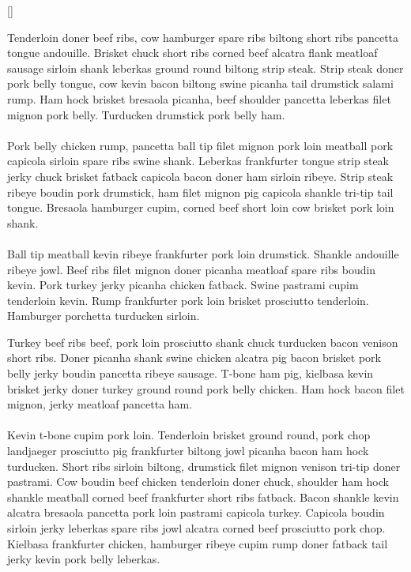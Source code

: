 []

Tenderloin doner beef ribs, cow hamburger spare ribs biltong short ribs pancetta tongue andouille. Brisket chuck short ribs corned beef alcatra flank meatloaf sausage sirloin shank leberkas ground round biltong strip steak. Strip steak doner pork belly tongue, cow kevin bacon biltong swine picanha tail drumstick salami rump. Ham hock brisket bresaola picanha, beef shoulder pancetta leberkas filet mignon pork belly. Turducken drumstick pork belly ham.

\paragraph{}
Pork belly chicken rump, pancetta ball tip filet mignon pork loin meatball pork capicola sirloin spare ribs swine shank. Leberkas frankfurter tongue strip steak jerky chuck brisket fatback capicola bacon doner ham sirloin ribeye. Strip steak ribeye boudin pork drumstick, ham filet mignon pig capicola shankle tri-tip tail tongue. Bresaola hamburger cupim, corned beef short loin cow brisket pork loin shank.

\paragraph{}
Ball tip meatball kevin ribeye frankfurter pork loin drumstick. Shankle andouille ribeye jowl. Beef ribs filet mignon doner picanha meatloaf spare ribs boudin kevin. Pork turkey jerky picanha chicken fatback. Swine pastrami cupim tenderloin kevin. Rump frankfurter pork loin brisket prosciutto tenderloin. Hamburger porchetta turducken sirloin.

Turkey beef ribs beef, pork loin prosciutto shank chuck turducken bacon venison short ribs. Doner picanha shank swine chicken alcatra pig bacon brisket pork belly jerky boudin pancetta ribeye sausage. T-bone ham pig, kielbasa kevin brisket jerky doner turkey ground round pork belly chicken. Ham hock bacon filet mignon, jerky meatloaf pancetta ham.

\paragraph{}
Kevin t-bone cupim pork loin. Tenderloin brisket ground round, pork chop landjaeger prosciutto pig frankfurter biltong jowl picanha bacon ham hock turducken. Short ribs sirloin biltong, drumstick filet mignon venison tri-tip doner pastrami. Cow boudin beef chicken tenderloin doner chuck, shoulder ham hock shankle meatball corned beef frankfurter short ribs fatback. Bacon shankle kevin alcatra bresaola pancetta pork loin pastrami capicola turkey. Capicola boudin sirloin jerky leberkas spare ribs jowl alcatra corned beef prosciutto pork chop. Kielbasa frankfurter chicken, hamburger ribeye cupim rump doner fatback tail jerky kevin pork belly leberkas.

